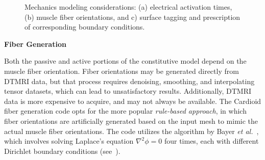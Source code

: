 \begin{figure}
{\label{fig:supp2}}
%
\caption{Mechanics modeling considerations: (a) electrical activation times, (b) muscle fiber orientations, and c) surface tagging and prescription of corresponding boundary conditions.}
\label{fig:supp}
\end{figure}

\textbf{Fiber Generation}

Both the passive and active portions of the constitutive model depend on the muscle fiber orientation. Fiber orientations may be generated directly from DTMRI data, but that process requires denoising, smoothing, and interpolating tensor datasets, which can lead to unsatisfactory results. Additionally, DTMRI data is more expensive to acquire, and may not always be available. The Cardioid fiber generation code opts for the more popular \textit{rule-based approach}, in which fiber orientations are artificially generated based on the input mesh to mimic the actual muscle fiber orientations. The code utilizes the algorithm by Bayer \textit{et al.}~\cite{bayer_2012}, which involves solving Laplace's equation $\nabla^2\phi = 0$ four times, each with different Dirichlet boundary conditions (see~).

